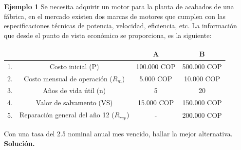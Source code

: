 
\textbf{Ejemplo 1}\newline
Se necesita adquirir un motor para la planta de acabados de una fábrica, en el mercado existen dos marcas de motores que cumplen con las especificaciones técnicas de potencia, velocidad, eficiencia, etc.
La información que desde el punto de vista económico se proporciona, es la siguiente:\\ 
\begin{center}
		\begin{tabular}{|c|c|c|c|}
			
			\hline
			\rowcolor[HTML]{FFB183}
			  &                               & A       & B       \\ \hline
			1. & Costo inicial (P)                 & 100.000 COP & 500.000 COP \\ \hline
			2. & Costo mensual de operación ($R_m$)   & 5.000 COP   & 10.000 COP \\ \hline
			3. & Años de vida útil (n)            & 5       & 20      \\ \hline
			4. & Valor de salvamento (VS)           & 15.000 COP  & 150.000 COP \\ \hline
			5. & Reparación general del año 12 ($R_{rep}$) & -      & 200.000 COP \\ \hline
		\end{tabular}
  \hspace{1cm}
\end{center}

Con una tasa del 2.5 nominal anual mes vencido, hallar la mejor alternativa. \\

\textbf{Solución.}\\



